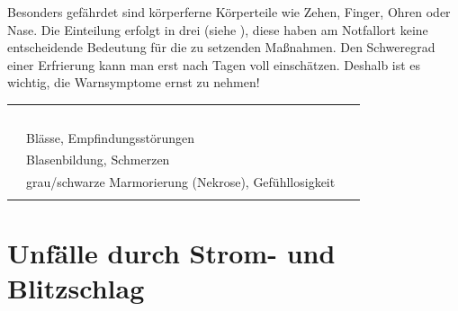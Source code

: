 
Besonders gefährdet sind körperferne Körperteile wie Zehen,
Finger, Ohren oder Nase.
Die Einteilung erfolgt in drei  (siehe
), diese haben am Notfallort
keine entscheidende Bedeutung für die zu setzenden
Maßnahmen. Den Schweregrad einer Erfrierung kann man erst
nach Tagen voll einschätzen. Deshalb ist es wichtig, die
Warnsymptome ernst zu nehmen!

\begin{table}[H]
\begin{center}
\begin{tabulary}{\linewidth}[H]{CLC}\addlinespace\toprule\addlinespace
\noindent{}
 &
\noindent{}
 &
\noindent~
\\\addlinespace\midrule{}
 &
Blässe, Empfindungsstörungen
 &
\\
 &
Blasenbildung, Schmerzen
 &
\\
 &
grau/schwarze Marmorierung (Nekrose), Gefühllosigkeit
\\\addlinespace\bottomrule
\end{tabulary}
\end{center}
\end{table}


{%
}{}




\clearpage %
\section{Unfälle durch Strom- und Blitzschlag}

